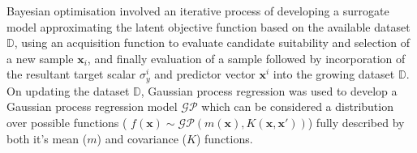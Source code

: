 Bayesian optimisation involved an iterative process of developing a surrogate
 model approximating the latent objective function based on the available
 dataset \(\mathbb{D}\), using an acquisition function to evaluate
 candidate suitability and selection of a new sample \(\mathbf{x}_{i}\), and
 finally evaluation of a sample followed by incorporation of the resultant
 target scalar \(\sigma_{y}^{i}\) and predictor vector \(\mathbf{x}^{i}\)
 into the growing dataset \(\mathbb{D}\).
On updating the dataset \(\mathbb{D}\), Gaussian process regression was used
 to develop a Gaussian process regression model \(\mathcal{GP}\) which can
 be considered a distribution over possible functions
 ( \(f(\mathbf{x})\sim \mathcal{GP}(m(\mathbf{x} ),K(\mathbf{x},\mathbf{x}'))\))
 fully described by both it's mean (\(m\)) and covariance (\(K\)) functions.











